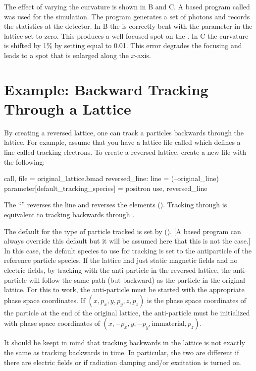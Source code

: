 The effect of varying the  curvature is shown in B and
C. A \bmad based program called  was used for the simulation. The 
program generates a set of photons and records the statistics at the detector. In B
the  is correctly bent with the parameter  in the lattice set to zero. This
produces a well focused spot on the . In C the  curvature
is shifted by 1\% by setting  equal to 0.01. This error degrades the focusing and leads to a
spot that is enlarged along the $x$-axis.


\section{Example: Backward Tracking Through a Lattice}
\label{s:reverse}

By creating a reversed lattice, one can track a particles backwards through the lattice. For example,
assume that you have a lattice file called  which defines a line
called  tracking electrons. To create a reversed lattice, create a new file with the following:
\begin{example}
  call, file = original_lattice.bmad
  reversed_line: line = (--original_line)
  parameter[default_tracking_species] = positron
  use, reversed_line
\end{example}
The ``\vn{-{}-}'' reverses the line and reverses the elements (). Tracking
through  is equivalent to tracking backwards through .

The default for the type of particle tracked is set by 
(). [A \bmad based program can always override this default but it will be assumed
here that this is not the case.] In this case, the default species to use for tracking is set to the
antiparticle of the reference particle species. If the  lattice had just static
magnetic fields and no electric fields, by tracking with the anti-particle in the reversed lattice,
the anti-particle will follow the same path (but backward) as the particle in the original
lattice. For this to work, the anti-particle must be started with the appropriate phase space
coordinates. If $(x, p_x, y, p_y, z, p_z)$ is the phase space coordinates of the particle at the end
of the original lattice, the anti-particle must be initialized with phase space coordinates of $(x,
-p_x, y, -p_y, \text{immaterial}, p_z)$.

It should be keept in mind that tracking backwards in the lattice is not exactly the same as
tracking backwards in time. In particular, the two are different if there are electric fields or if
radiation damping and/or excitation is turned on.

